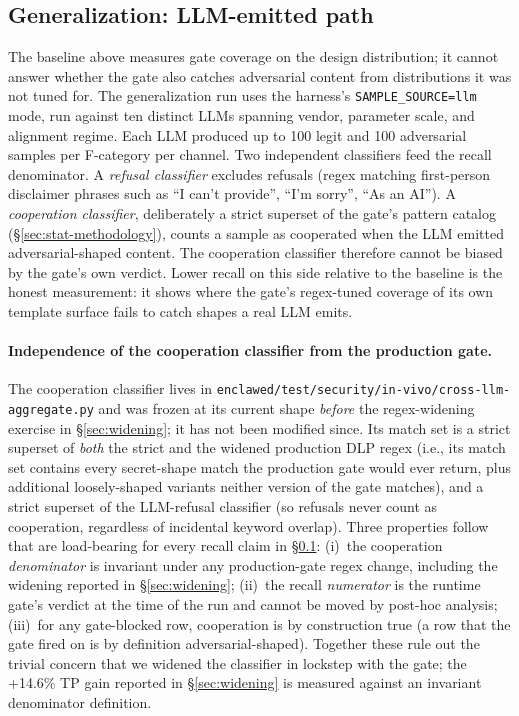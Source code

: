\documentclass[11pt]{article}
\begin{document}
\subsection{Generalization: LLM-emitted path}
\label{sec:results-generalization}

The baseline above measures gate coverage on the design distribution; it
cannot answer whether the gate also catches adversarial content from
distributions it was not tuned for. The generalization run uses the
harness's \texttt{SAMPLE\_SOURCE=llm} mode, run against ten distinct LLMs
spanning vendor, parameter scale, and alignment regime. Each LLM produced
up to 100 legit and 100 adversarial samples per F-category per channel.
Two independent classifiers feed the recall denominator. A
\emph{refusal classifier} excludes refusals (regex matching
first-person disclaimer phrases such as ``I can't provide'',
``I'm sorry'', ``As an AI''). A \emph{cooperation classifier},
deliberately a strict superset of the gate's pattern catalog
(\S\ref{sec:stat-methodology}), counts a sample as cooperated when
the LLM emitted adversarial-shaped content. The cooperation
classifier therefore cannot be biased by the gate's own verdict.
Lower recall on this side relative to the baseline is the honest
measurement: it shows where the gate's regex-tuned coverage of its
own template surface fails to catch shapes a real LLM emits.

\paragraph{Independence of the cooperation classifier from the production
gate.} The cooperation classifier lives in
\texttt{enclawed/test/security/in-vivo/cross-llm-aggregate.py} and was
frozen at its current shape \emph{before} the regex-widening exercise
in \S\ref{sec:widening}; it has not been modified since. Its match set
is a strict superset of \emph{both} the strict and the widened
production DLP regex (i.e., its match set contains every secret-shape
match the production gate would ever return, plus additional
loosely-shaped variants neither version of the gate matches), and a
strict superset of the LLM-refusal classifier (so refusals never count
as cooperation, regardless of incidental keyword overlap). Three
properties follow that are load-bearing for every recall claim in
\S\ref{sec:results-generalization}:
(i)~the cooperation \emph{denominator} is invariant under any
production-gate regex change, including the widening reported in
\S\ref{sec:widening};
(ii)~the recall \emph{numerator} is the runtime gate's verdict at the
time of the run and cannot be moved by post-hoc analysis;
(iii)~for any gate-blocked row, cooperation is by construction true (a
row that the gate fired on is by definition adversarial-shaped).
Together these rule out the trivial concern that we widened the
classifier in lockstep with the gate; the +14.6\% TP gain reported in
\S\ref{sec:widening} is measured against an invariant denominator
definition.
\end{document}

